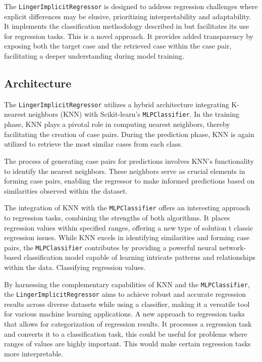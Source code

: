 \documentclass[a4paper, 12pt]{report}
\begin{document}
The \texttt{LingerImplicitRegressor} is designed to address regression challenges where explicit differences may be elusive, prioritizing interpretability and adaptability. 
It implements the classification methodology described in \cite{ye2021learning} but facilitates its use for regression tasks. This is a novel approach.
It provides added transparency by exposing both the target case and the retrieved case within the case pair, facilitating a deeper understanding during model training.

\subsection{Architecture}
The \texttt{LingerImplicitRegressor} utilizes a hybrid architecture integrating K-nearest neighbors (KNN) with Scikit-learn's \texttt{MLPClassifier}. 
In the training phase, KNN plays a pivotal role in computing nearest neighbors, thereby facilitating the creation of case pairs. 
During the prediction phase, KNN is again utilized to retrieve the most similar cases from each class.

The process of generating case pairs for predictions involves KNN's functionality to identify the nearest neighbors. 
These neighbors serve as crucial elements in forming case pairs, enabling the regressor to make informed predictions based on similarities observed within the dataset.

The integration of KNN with the \texttt{MLPClassifier} offers an interesting approach to regression tasks, combining the strengths of both algorithms. 
It places regression values within specified ranges, offering a new type of solution t classic regression issues.
While KNN excels in identifying similarities and forming case pairs, the \texttt{MLPClassifier} contributes 
by providing a powerful neural network-based classification model capable of learning intricate patterns and relationships within the data. Classifying regression values.

By harnessing the complementary capabilities of KNN and the \texttt{MLPClassifier}, the \texttt{LingerImplicitRegressor}
aims to achieve robust and accurate regression results across diverse datasets while using a classifier, making it a versatile tool for various machine learning applications. A new approach to regression tasks that allows
for categorization of regression results.
It processes a regression task and converts it to a classification task, this could be useful for problems where ranges of values are highly important. 
This would make certain regression tasks more interpretable.
\end{document}
